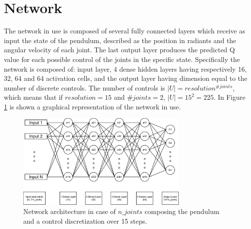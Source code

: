 \documentclass[twocolumn, a4paper]{article}
\begin{document}
\section{Network}
The network in use is composed of several fully connected layers which receive
as input the state of the pendulum, described as the position in
radiants and the angular velocity of each joint.
The last output layer produces the predicted Q value for each possible control
of the joints in the specific state.
Specifically the network is composed of: input layer, 4 dense hidden layers
having respectively 16, 32, 64 and 64 activation cells, and the output layer
having dimension equal to the number of discrete controls.
The number of controls is \(|U|=resolution^{\#joints}\), which
means that if \(resolution=15\) and \(\#joints=2\), \(|U|=15^{2}=225\).
In Figure \ref{fig:Network} is shown a graphical representation of the network
in use.

\begin{figure}
	\centering
	\includegraphics[width=8.5cm]{"../Figures/Network_schema"}
	\caption{Network architecture in case of $n\_joints$ composing the pendulum
			 and a control discretization over 15 steps.}
	\label{fig:Network}
\end{figure}
\end{document}
